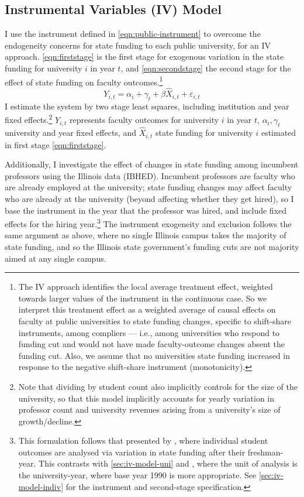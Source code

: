 \subsection{Instrumental Variables (IV) Model}
\label{sec:iv-model-uni}

I use the instrument defined in \autoref{eqn:public-instrument} to overcome the endogeneity concerns for state funding to each public university, for an IV approach.
\autoref{eqn:firststage} is the first stage for exogenous variation in the state funding for university $i$ in year $t$, and \autoref{eqn:secondstage} the second stage for the effect of state funding on faculty outcomes.\footnote{
    The IV approach identifies the local average treatment effect, weighted towards larger values of the instrument in the continuous case.
    So we interpret this treatment effect as a weighted average of causal effects on faculty at public universities to state funding changes, specific to shift-share instruments, among compliers --- i.e., among universities who respond to funding cut and would not have made faculty-outcome changes absent the funding cut.
    Also, we assume that no universities state funding increased in response to the negative shift-share instrument (monotonicity).
}
\begin{equation}
    \label{eqn:secondstage}
    Y_{i,t} = \alpha_i + \gamma_t + \beta \widehat X_{i,t} + \varepsilon_{i,t}
\end{equation}
I estimate the system by two stage least squares, including institution and year fixed effects.\footnote{
    Note that dividing by student count also implicitly controls for the size of the university, so that this model implicitly accounts for yearly variation in professor count and university revenues arising from a university's size of growth/decline.
}
$Y_{i,t}$ represents faculty outcomes for university $i$ in year $t$, $\alpha_i, \gamma_t$ university and year fixed effects, and $\widehat X_{i,t}$ state funding for university $i$ estimated in first stage \eqref{eqn:firststage}.

Additionally, I investigate the effect of changes in state funding among incumbent professors using the Illinois data (IBHED).
Incumbent professors are faculty who are already employed at the university; state funding changes may affect faculty who are already at the university (beyond affecting whether they get hired), so I base the instrument in the year that the professor was hired, and include fixed effects for the hiring year.\footnote{
    This formulation follows that presented by \cite{NBERw27885}, where individual student outcomes are analysed via variation in state funding after their freshman-year.
    This contrasts with \autoref{sec:iv-model-uni} and \cite{NBERw23736}, where the unit of analysis is the university-year, where base year 1990 is more appropriate.
    See \autoref{sec:iv-model-indiv} for the instrument and second-stage specification.
}
The instrument exogeneity and exclusion follows the same argument as above, where no single Illinois campus takes the majority of state funding, and so
the Illinois state government's funding cuts are not majority aimed at any single campus.

